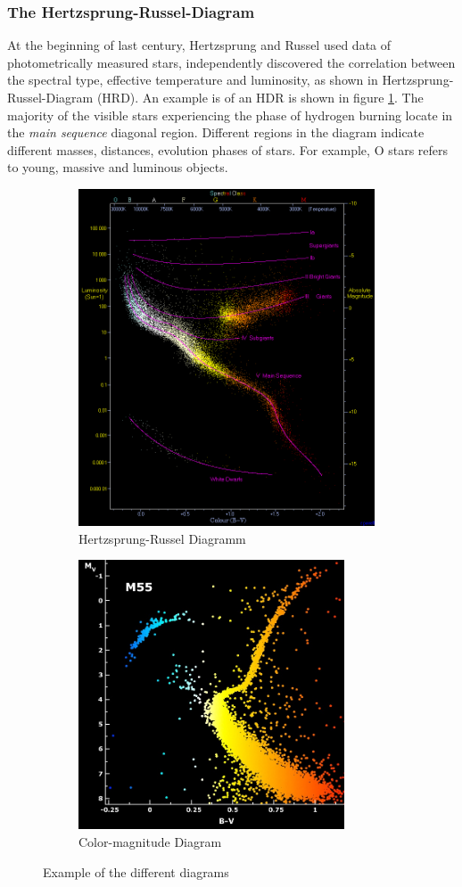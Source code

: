 \subsubsection{The Hertzsprung-Russel-Diagram}
At the beginning of last century, Hertzsprung and Russel used data of  photometrically measured stars, independently discovered the correlation between the spectral type, effective temperature and luminosity, as shown in Hertzsprung-Russel-Diagram (HRD). An example is of an HDR is shown in figure \ref{HRD}. The majority of the visible stars experiencing the phase of hydrogen burning locate in the \textit{main sequence} diagonal region. Different regions in the diagram indicate different masses, distances, evolution phases of stars. For example, O stars refers to young, massive and luminous objects.

\begin{figure}[h]
	\begin{subfigure}{0.5\textwidth}
	\centering
	\includegraphics[width=0.9\linewidth ,height=10cm]{report_pictures/HRDiagram.png}
	\caption{Hertzsprung-Russel Diagramm \cite{HRWiki}}
	\label{HRD}
	\end{subfigure}
	\begin{subfigure}{0.5\textwidth}
	\centering
	\includegraphics[width=0.9\linewidth ,height=8cm]{report_pictures/CMDiagram.png}
	\caption{Color-magnitude Diagram \cite{NASA}}
	\label{GC_ex}
	\end{subfigure}
	\caption{Example of the different diagrams}
	\label{diagram}
\end{figure}

